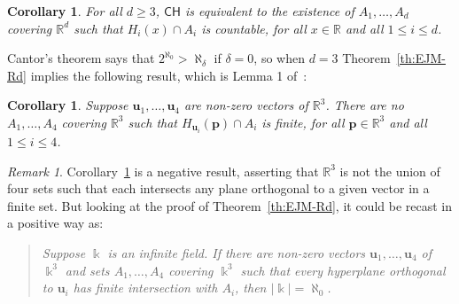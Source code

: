 \documentclass[12pt]{amsart}
\newcommand{\CH}{{\mathsf{CH}}}	%
\newcommand{\R}{\mathbb{R}}	%
\newcommand{\card}[1]{\mathopen | #1 \mathclose |}		%
\theoremstyle{plain}
\newtheorem{corollary}[theorem]{Corollary}
\theoremstyle{definition}
\theoremstyle{remark}
\newtheorem{remark}[theorem]{Remark}
\begin{document}
\begin{corollary} \label{cor:Sierpinski51}
For all \( d \geq 3 \), \( \CH \) is equivalent to the existence of \( A_1 , \dots , A_d \) covering \( \R^d \) such that \( H_i ( x ) \cap A_i \) is countable, for all \( x \in \R \) and all \( 1 \leq i \leq d \).
\end{corollary}

Cantor's theorem says that \( 2^{\aleph_0} > \aleph_{ \delta } \) if \( \delta = 0 \), so when \( d = 3 \) Theorem~\ref{th:EJM-Rd} implies the following result, which is Lemma 1 of~\cite{Erdos:1994yq}:

\begin{corollary} \label{cor:EJM-Rd-2}
Suppose \( \mathbf{u}_1 , \dots , \mathbf{u}_4 \) are non-zero vectors of \( \R^3 \).
There are no \( A_1 , \dots , A_4 \) covering \( \R^3 \) such that \( H_{\mathbf{u}_i} ( \mathbf{p} ) \cap A_i \) is finite, for all \( \mathbf{p} \in \R^3 \) and all \( 1 \leq i \leq 4 \).
\end{corollary}

\begin{remark}
Corollary~\ref{cor:EJM-Rd-2} is a negative result, asserting that \( \R^3 \) is not the union of four sets such that each intersects any plane orthogonal to a given vector in a finite set.
But looking at the proof of Theorem~\ref{th:EJM-Rd}, it could be recast in a positive way as:
\begin{quote}
\textit{Suppose \( \Bbbk \) is an infinite field. 
If there are non-zero vectors \( \mathbf{u}_1 , \dots , \mathbf{u}_4 \) of \( \Bbbk^3 \) and sets \( A_1 , \dots , A_4 \) covering \( \Bbbk^3 \) such that every hyperplane orthogonal to \( \mathbf{u}_i \) has finite intersection with \( A_i \), then \( \card{ \Bbbk } = \aleph_0 \).}
\end{quote}
\end{remark}
\end{document}
